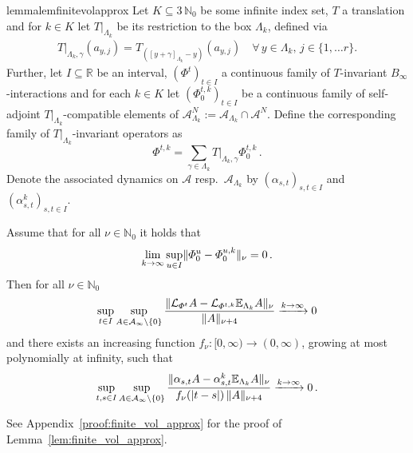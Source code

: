 \documentclass[a4paper]{article}
\newcommand{\E}{\mathbb{E}}
\renewcommand{\Phi}{\varPhi}
\newcommand{\fd}{r}
\newcommand{\La}{\Lambda}
\newcommand{\N}{\mathbb{N}}
\newcommand{\mA}{\mathcal{A}}
\newcommand{\R}{\mathbb{R}}
\newcommand{\mL}{\mathcal{L}}
\DeclarePairedDelimiter\norm{\lVert}{\rVert}
\theoremstyle{plain}
\theoremstyle{definition}
\theoremstyle{remark}
\renewcommand{\(}{\left(}
\renewcommand{\)}{\right)}
\begin{document}
\begin{restatable}{lemma}{lemfinitevolapprox}
\label{lem:finite_vol_approx}
    Let $K\subseteq 3\,\N_0$ be some infinite index set, $T$ a translation and for $k\in K$ let $T|_{\Lambda_k}$ be its restriction to the box $\Lambda_k$, defined via
    \begin{align*}
        T|_{\Lambda_k,\gamma}(a_{y,j})  = T_{([y+\gamma]_{\Lambda_k} -y)}(a_{y,j}) \quad \forall\, y\in \Lambda_{k},\, j \in \{1,\dots \fd\}. 
    \end{align*}
    Further, let $I\subseteq \R$ be an interval, $(\Phi^t)_{t\in I}$ a continuous family of $T$-invariant $B_\infty$-interactions and for each $k\in K$ let $(\Phi^{t,k}_0)_{t\in I}$ be a continuous family of self-adjoint $T|_{\Lambda_k}$-compatible elements of $\mA^N_{\Lambda_k} := \mA_{\Lambda_k} \cap \mA^N$. Define the corresponding family of $T|_{\Lambda_k}$-invariant operators as 
    \[
        \Phi^{t,k} = \sum_{\gamma\in\Lambda_k} T|_{\Lambda_k,\gamma}\Phi^{t,k}_0\,.
    \]
 Denote the associated dynamics on $\mA$ resp.\ $\mA_{\Lambda_k}$ by 
$(\alpha_{s,t})_{s,t\in I}$ and $(\alpha^{k}_{s,t})_{s,t\in I}$.

    Assume that for all $\nu\in\N_0$ it holds that 
    \[
  \lim_{k\to\infty}
    \sup_{u\in I} \norm{ 
    \Phi^u_0 - \Phi^{u,k}_0}_{\nu}=0\,.
    \]
   Then  for all $\nu\in\N_0$
   \begin{align*}
        \sup_{t\in I}\sup_{A\in \mA_\infty\setminus\{0\}} \frac{\norm{\mL_{\Phi^t} A - \mL_{\Phi^{t,k}} \E_{\La_{k}}A }_{\nu}}{\norm{A}_{\nu+4}} \xrightarrow{k\to\infty} 0
    \end{align*}
    and there exists an increasing function $f_\nu:[0,\infty)\to (0,\infty)$, growing at most polynomially  at infinity, such that 
    \begin{align*}
       \sup_{t,s\in I} \sup_{A\in \mA_\infty\setminus\{0\}} \frac{\norm{\alpha_{s,t} A - \alpha_{s,t}^{k} \E_{\La_{k}}A }_{\nu}}{f_\nu(|t-s|) \,\norm{A}_{\nu+4}} \xrightarrow{k\to\infty} 0\,.
    \end{align*}
\end{restatable}
\noindent
See Appendix~\ref{proof:finite_vol_approx} for the proof of Lemma~\ref{lem:finite_vol_approx}.
 



\vspace{0.5\baselineskip}
\end{document}
